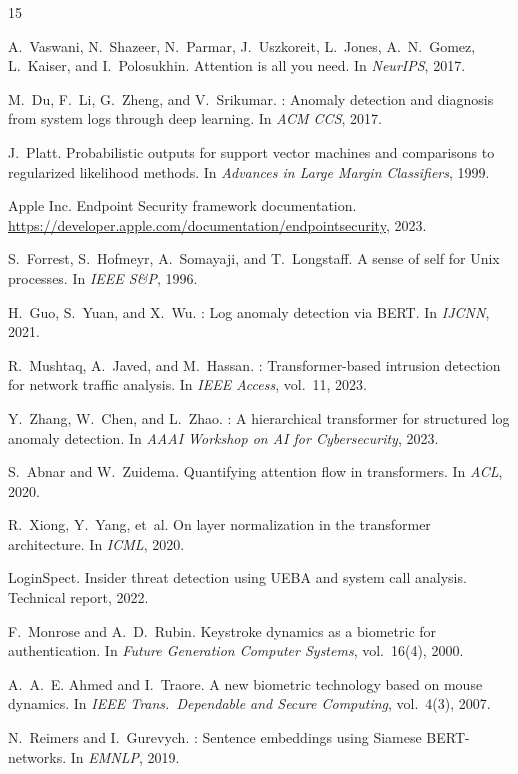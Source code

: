 \documentclass[letterpaper,twocolumn,10pt]{article}
\begin{document}
\begin{thebibliography}{15}

A.~Vaswani, N.~Shazeer, N.~Parmar, J.~Uszkoreit, L.~Jones,
A.~N.~Gomez, L.~Kaiser, and I.~Polosukhin.
\newblock Attention is all you need.
\newblock In {\em NeurIPS}, 2017.

M.~Du, F.~Li, G.~Zheng, and V.~Srikumar.
: Anomaly detection and diagnosis from system
logs through deep learning.
\newblock In {\em ACM CCS}, 2017.

J.~Platt.
\newblock Probabilistic outputs for support vector machines and
comparisons to regularized likelihood methods.
\newblock In {\em Advances in Large Margin Classifiers}, 1999.

Apple Inc.
\newblock Endpoint Security framework documentation.
\newblock \url{https://developer.apple.com/documentation/endpointsecurity},
2023.

S.~Forrest, S.~Hofmeyr, A.~Somayaji, and T.~Longstaff.
\newblock A sense of self for {Unix} processes.
\newblock In {\em IEEE S\&P}, 1996.

H.~Guo, S.~Yuan, and X.~Wu.
: Log anomaly detection via {BERT}.
\newblock In {\em IJCNN}, 2021.

R.~Mushtaq, A.~Javed, and M.~Hassan.
: Transformer-based intrusion detection for
network traffic analysis.
\newblock In {\em IEEE Access}, vol.~11, 2023.

Y.~Zhang, W.~Chen, and L.~Zhao.
: A hierarchical transformer for structured
log anomaly detection.
\newblock In {\em AAAI Workshop on AI for Cybersecurity}, 2023.

S.~Abnar and W.~Zuidema.
\newblock Quantifying attention flow in transformers.
\newblock In {\em ACL}, 2020.

R.~Xiong, Y.~Yang, et~al.
\newblock On layer normalization in the transformer architecture.
\newblock In {\em ICML}, 2020.

LoginSpect.
\newblock Insider threat detection using {UEBA} and system call
analysis.
\newblock Technical report, 2022.

F.~Monrose and A.~D.~Rubin.
\newblock Keystroke dynamics as a biometric for authentication.
\newblock In {\em Future Generation Computer Systems},
vol.~16(4), 2000.

A.~A.~E. Ahmed and I.~Traore.
\newblock A new biometric technology based on mouse dynamics.
\newblock In {\em IEEE Trans.\ Dependable and Secure Computing},
vol.~4(3), 2007.

N.~Reimers and I.~Gurevych.
: Sentence embeddings using {Siamese}
{BERT}-networks.
\newblock In {\em EMNLP}, 2019.

\end{thebibliography}
\end{document}
